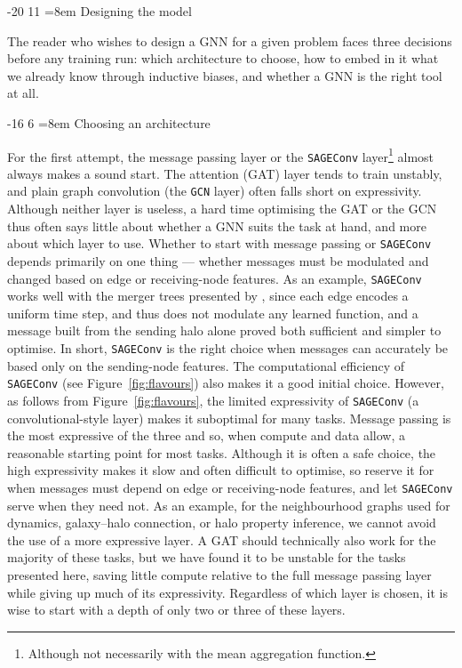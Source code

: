 \documentclass[graybox, envcountchap]{Template/svmult}
\makeatletter
\renewcommand\subsection{\@startsection{subsection}{2}{\z@}%
                       {-20\p@}%
                       {11\p@}%
                       {\normalfont\subsecsize\subsecstyle
                        \rightskip=\z@ \@plus 8em\pretolerance=10000 }}
\renewcommand\subsubsection{\@startsection{subsubsection}{3}{\z@}%
                       {-16\p@}%
                       {6\p@}%
                       {\normalfont\normalsize\subsubsecstyle
                        \rightskip=\z@ \@plus 8em\pretolerance=10000 }}
\makeatother
\begin{document}
\subsection{Designing the model}

The reader who wishes to design a GNN for a given problem faces three decisions before any training run: which architecture to choose, how to embed in it what we already know through inductive biases, and whether a GNN is the right tool at all.

\subsubsection{Choosing an architecture}
\label{subsec:bp-choose}

For the first attempt, the message passing layer or the \texttt{SAGEConv} layer\footnote{Although not necessarily with the mean aggregation function.} almost always makes a sound start. The attention (GAT) layer tends to train unstably, and plain graph convolution (the \texttt{GCN} layer) often falls short on expressivity.  Although neither layer is useless, a hard time optimising the GAT or the GCN thus often says little about whether a GNN suits the task at hand, and more about which layer to use. Whether to start with message passing or \texttt{SAGEConv} depends primarily on one thing --- whether messages must be modulated and changed based on edge or receiving-node features. As an example, \texttt{SAGEConv} works well with the merger trees presented by \citet{Jespersen2022_mangrove}, since each edge encodes a uniform time step, and thus does not modulate any learned function, and a message built from the sending halo alone proved both sufficient and simpler to optimise. In short, \texttt{SAGEConv} is the right choice when messages can accurately be based only on the sending-node features. The computational efficiency of \texttt{SAGEConv} (see Figure~\ref{fig:flavours}) also makes it a good initial choice. However, as follows from Figure~\ref{fig:flavours}, the limited expressivity of \texttt{SAGEConv} (a convolutional-style layer) makes it suboptimal for many tasks. Message passing is the most expressive of the three and so, when compute and data allow, a reasonable starting point for most tasks. Although it is often a safe choice, the high expressivity makes it slow and often difficult to optimise, so reserve it for when messages must depend on edge or receiving-node features, and let \texttt{SAGEConv} serve when they need not. As an example, for the neighbourhood graphs used for dynamics, galaxy--halo connection, or halo property inference, we cannot avoid the use of a more expressive layer. A GAT should technically also work for the majority of these tasks, but we have found it to be unstable for the tasks presented here, saving little compute relative to the full message passing layer while giving up much of its expressivity. Regardless of which layer is chosen, it is wise to start with a depth of only two or three of these layers. 
\end{document}
